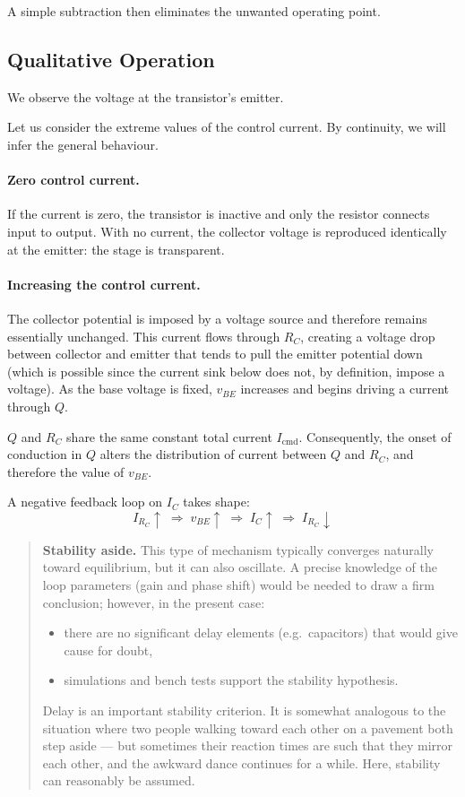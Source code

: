 \documentclass[10pt]{article}
\begin{document}
A simple subtraction then eliminates the unwanted operating point.


\subsection*{Qualitative Operation}

We observe the voltage at the transistor's emitter.

Let us consider the extreme values of the control current.
By continuity, we will infer the general behaviour.

\paragraph{Zero control current.}
If the current is zero, the transistor is inactive and only the resistor connects input to output.
With no current, the collector voltage is reproduced identically at the emitter: the stage is transparent.

\paragraph{Increasing the control current.}
The collector potential is imposed by a voltage source and therefore remains essentially unchanged.
This current flows through $R_C$, creating a voltage drop between collector and emitter that tends to pull the emitter potential down
(which is possible since the current sink below does not, by definition, impose a voltage).
As the base voltage is fixed, $v_{BE}$ increases and begins driving a current through $Q$.

$Q$ and $R_C$ share the same constant total current $I_\mathrm{cmd}$.
Consequently, the onset of conduction in $Q$ alters the distribution of current between $Q$ and $R_C$,
and therefore the value of $v_{BE}$.

A negative feedback loop on $I_C$ takes shape:
\[
  I_{R_C} \uparrow \;\Rightarrow\; v_{BE} \uparrow \;\Rightarrow\; I_C \uparrow \;\Rightarrow\; I_{R_C} \downarrow
\]

\begin{quote}
  \textbf{Stability aside.}
  This type of mechanism typically converges naturally toward equilibrium, but it can also oscillate.
  A precise knowledge of the loop parameters (gain and phase shift) would be needed to draw a firm conclusion; however, in the present case:
  \begin{itemize}
    \item there are no significant delay elements (e.g.\ capacitors) that would give cause for doubt,
    \item simulations and bench tests support the stability hypothesis.
  \end{itemize}
  Delay is an important stability criterion.
  It is somewhat analogous to the situation where two people walking toward each other on a pavement both step aside --- but sometimes their reaction times are such that they mirror each other, and the awkward dance continues for a while.
  Here, stability can reasonably be assumed.
\end{quote}
\end{document}
